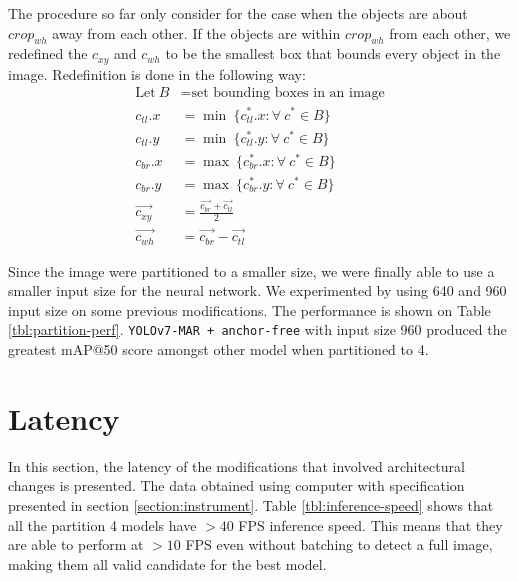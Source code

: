 The procedure so far only consider for the case when the objects are about $crop_{wh}$ away from each other.
If the objects are within $crop_{wh}$ from each other, we redefined the $c_{xy}$ and $c_{wh}$ to be the smallest box
that bounds every object in the image. Redefinition is done in the following way:
\begin{align}
  \text{Let}~B &= \text{set bounding boxes in an image} \nonumber \\
  c_{tl}.x &= \min \ \{c^*_{tl}.x : \forall\ c^* \in B\} \nonumber \\
  c_{tl}.y &= \min \ \{c^*_{tl}.y : \forall\ c^* \in B\}\nonumber \\
  c_{br}.x &= \max \ \{c^*_{br}.x : \forall\ c^* \in B\}\nonumber \\
  c_{br}.y &= \max \ \{c^*_{br}.y : \forall\ c^* \in B\}\nonumber \\
  \overrightarrow{c_{xy}} &= \frac{\overrightarrow{c_{br}}+\overrightarrow{c_{tl}}}{2} \label{eq:partition-newcxy}\\
  \overrightarrow{c_{wh}} &= \overrightarrow{c_{br}}-\overrightarrow{c_{tl}} \label{eq:partition-newcwh}
\end{align}

Since the image were partitioned to a  smaller size, we were finally able to use a smaller input size 
for the neural network. We experimented by using 640 and 960 input size on some previous modifications.
The performance is shown on Table \ref{tbl:partition-perf}.
\verb|YOLOv7-MAR + anchor-free| with input size 960 produced the greatest mAP@50 score
amongst other model when partitioned to 4.



\begin{table}[b]
  \centering
  \label{tbl:partition-perf}
  \vspace{-1ex}
  
\end{table}

\section{Latency}
In this section, the latency of the modifications that involved architectural changes is presented.
The data obtained using computer with specification presented in section \ref{section:instrument}.
Table \ref{tbl:inference-speed} shows that all the partition 4 models have $> 40$ FPS inference speed.
This means that they are able to perform at $>10$ FPS even without batching to detect a full image, making them all valid candidate for the best model.

